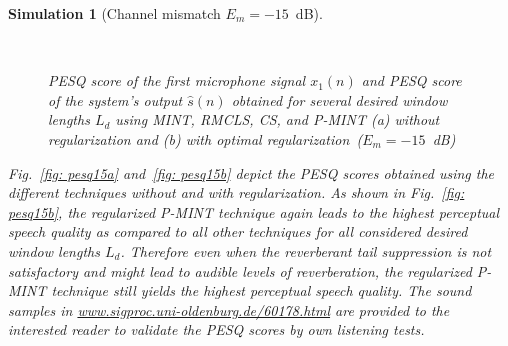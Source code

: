 \documentclass[10pt]{IEEEtran}
\newtheorem{simulation}{Simulation}
\begin{document}
\begin{simulation}[Channel mismatch $E_m=-15$~dB]
\begin{figure}[t]
\centering
\hbox{\hspace{-0.5cm}
}
\caption{PESQ score of the first microphone signal $x_1(n)$ and PESQ score of the system's output $\hat{s}(n)$ obtained for several desired window lengths $L_d$ using MINT, RMCLS, CS, and P-MINT (a) without regularization and (b) with optimal regularization~($E_m = -15$~dB)}
\end{figure}
Fig.~\ref{fig: pesq15a} and~\ref{fig: pesq15b} depict the PESQ scores obtained using the different techniques without and with regularization.
As shown in Fig.~\ref{fig: pesq15b}, the regularized P-MINT technique again leads to the highest perceptual speech quality as compared to all other techniques for all considered desired window lengths $L_d$. Therefore even when the reverberant tail suppression is not satisfactory and might lead to audible levels of reverberation, the regularized P-MINT technique still yields the highest perceptual speech quality. The sound samples in {\small \url{www.sigproc.uni-oldenburg.de/60178.html}} are provided to the interested reader to validate the PESQ scores by own listening tests.


\end{simulation}
\end{document}
